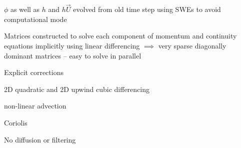 \begin{slide}
\begin{list0}
\item $\phi$ as well as $h$ and $h\vec{U}$ evolved from old time step using SWEs to avoid computational mode

\item Matrices constructed to solve each component of momentum and continuity equations implicitly using linear differencing $\implies$ very sparse diagonally dominant matrices -- easy to solve in parallel

\item Explicit corrections
\begin{minipage}[t]{0.7\linewidth}\raggedright\begin{list2m}
\item 2D quadratic and 2D upwind cubic differencing
\item non-linear advection
\item Coriolis
\end{list2m}\end{minipage}

\item No diffusion or filtering

\end{list0}

\end{slide}

